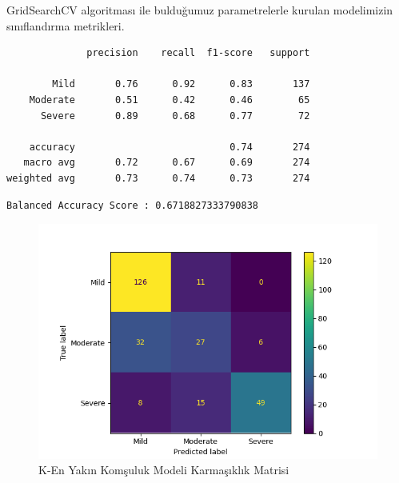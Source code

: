 \documentclass[12pt,twoside]{deuthesis}
\begin{document}
GridSearchCV algoritması ile bulduğumuz parametrelerle kurulan modelimizin sınıflandırma metrikleri.
\begin{verbatim}
              precision    recall  f1-score   support

        Mild       0.76      0.92      0.83       137
    Moderate       0.51      0.42      0.46        65
      Severe       0.89      0.68      0.77        72

    accuracy                           0.74       274
   macro avg       0.72      0.67      0.69       274
weighted avg       0.73      0.74      0.73       274
\end{verbatim}
\begin{verbatim}
Balanced Accuracy Score : 0.6718827333790838
\end{verbatim}
\begin{figure}

{\centering \includegraphics[width=1.05\linewidth,height=0.6\textheight]{figure/knn_conf} 

}

\caption{K-En Yakın Komşuluk Modeli Karmaşıklık Matrisi}\label{fig:unnamed-chunk-18}
\end{figure}
\end{document}
